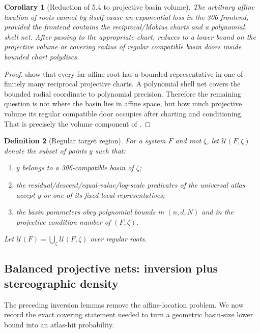 \documentclass[11pt]{article}
\newtheorem{definition}{Definition}[section]
\newtheorem{corollary}[definition]{Corollary}
\newcommand{\U}{\mathcal U}
\begin{document}
\begin{corollary}[Reduction of 5.4 to projective basin volume]\label{cor:volume-reduction}
The arbitrary affine location of roots cannot by itself cause an exponential loss in the 306 frontend, provided the frontend contains the reciprocal/Mobius charts and a polynomial shell net.  After passing to the appropriate chart,  reduces to a lower bound on the projective volume or covering radius of regular compatible basin doors inside bounded chart polydiscs.
\end{corollary}

\begin{proof}
 show that every far affine root has a bounded representative in one of finitely many reciprocal projective charts.  A polynomial shell net covers the bounded radial coordinate to polynomial precision.  Therefore the remaining question is not where the basin lies in affine space, but how much projective volume its regular compatible door occupies after charting and conditioning.  That is precisely the volume component of .
\end{proof}

\begin{definition}[Regular target region]
For a system $F$ and root $\zeta$, let $\U(F,\zeta)$ denote the subset of points $y$ such that:
\begin{enumerate}[label=(\roman*)]
\item $y$ belongs to a 306-compatible basin of $\zeta$;
\item the residual/descent/equal-value/log-scale predicates of the universal atlas accept $y$ or one of its fixed local representatives;
\item the basin parameters obey polynomial bounds in $(n,d,N)$ and in the projective condition number of $(F,\zeta)$.
\end{enumerate}
Let $\U(F)=\bigcup_\zeta\U(F,\zeta)$ over regular roots.
\end{definition}

\subsection{Balanced projective nets: inversion plus stereographic density}

The preceding inversion lemmas remove the affine-location problem.  We now record the exact covering statement needed to turn a geometric basin-size lower bound into an atlas-hit probability.
\end{document}
